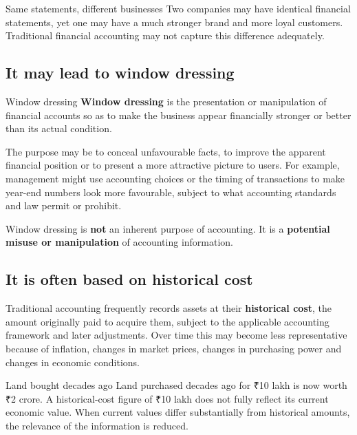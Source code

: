 \documentclass[11pt,a4paper]{article}
\newcommand{\Rs}{{\rsfont ₹}}
\begin{document}
\begin{exbox}{Same statements, different businesses}
Two companies may have identical financial statements, yet one may have a much stronger brand and
more loyal customers. Traditional financial accounting may not capture this difference adequately.
\end{exbox}

\subsection{It may lead to window dressing}

\begin{defbox}{Window dressing}
\textbf{Window dressing} is the presentation or manipulation of financial accounts so as to make
the business appear financially stronger or better than its actual condition.
\end{defbox}

The purpose may be to conceal unfavourable facts, to improve the apparent financial position or
to present a more attractive picture to users. For example, management might use accounting
choices or the timing of transactions to make year-end numbers look more favourable, subject to what
accounting standards and law permit or prohibit.

\begin{impbox}
Window dressing is \textbf{not} an inherent purpose of accounting. It is a \textbf{potential misuse
or manipulation} of accounting information.
\end{impbox}

\subsection{It is often based on historical cost}

Traditional accounting frequently records assets at their \textbf{historical cost}, the amount originally
paid to acquire them, subject to the applicable accounting framework and later adjustments.
Over time this may become less representative because of inflation, changes in market prices,
changes in purchasing power and changes in economic conditions.

\begin{exbox}{Land bought decades ago}
Land purchased decades ago for \Rs 10 lakh is now worth \Rs 2 crore. A historical-cost figure of
\Rs 10 lakh does not fully reflect its current economic value. When current values differ substantially
from historical amounts, the relevance of the information is reduced.
\end{exbox}
\end{document}
